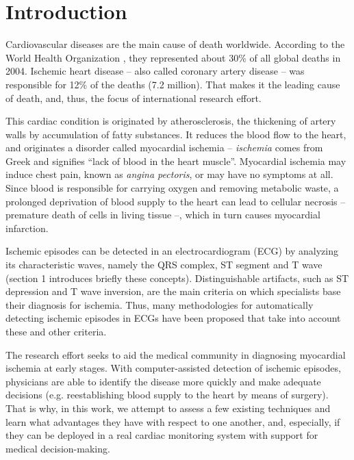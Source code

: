 
\section*{Introduction}
\label{sec:intro}

Cardiovascular diseases are the main cause of death worldwide. According to the World Health Organization \cite{Who04}, they represented about 30\% of all global deaths in 2004. Ischemic heart disease -- also called coronary artery disease -- was responsible for 12\% of the deaths (7.2 million). That makes it the leading cause of death, and, thus, the focus of international research effort.

This cardiac condition is originated by atherosclerosis, the thickening of artery walls by accumulation of fatty substances. It reduces the blood flow to the heart, and originates a disorder called myocardial ischemia -- \textit{ischemia} comes from Greek and signifies ``lack of blood in the heart muscle''. Myocardial ischemia may induce chest pain, known as \textit{angina pectoris}, or may have no symptoms at all. Since blood is responsible for carrying oxygen and removing metabolic waste, a prolonged deprivation of blood supply to the heart can lead to cellular necrosis -- premature death of cells in living tissue --, which in turn causes myocardial infarction.

Ischemic episodes can be detected in an electrocardiogram (ECG) by analyzing its characteristic waves, namely the QRS complex, ST segment and T wave (section 1 introduces briefly these concepts). Distinguishable artifacts, such as ST depression and T wave inversion, are the main criteria on which specialists base their diagnosis for ischemia. Thus, many methodologies for automatically detecting ischemic episodes in ECGs have been proposed that take into account these and other criteria.

The research effort seeks to aid the medical community in diagnosing myocardial ischemia at early stages. With computer-assisted detection of ischemic episodes, physicians are able to identify the disease more quickly and make adequate decisions (e.g. reestablishing blood supply to the heart by means of surgery). That is why, in this work, we attempt to assess a few existing techniques and learn what advantages they have with respect to one another, and, especially, if they can be deployed in a real cardiac monitoring system with support for medical decision-making.

